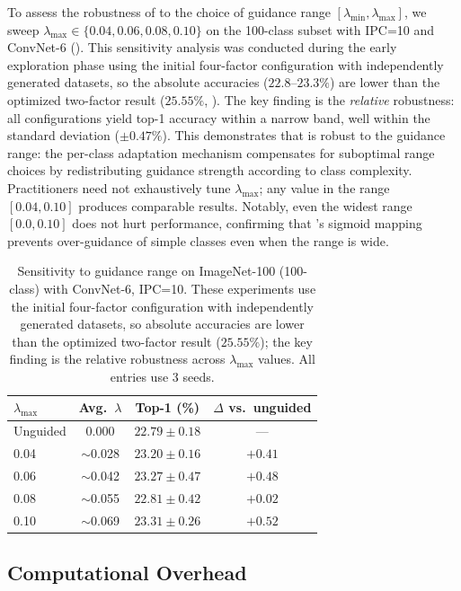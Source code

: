 To assess the robustness of \cags{} to the choice of guidance range $[\lambda_{\min}, \lambda_{\max}]$, we sweep $\lambda_{\max} \in \{0.04, 0.06, 0.08, 0.10\}$ on the 100-class subset with IPC=10 and ConvNet-6 (). This sensitivity analysis was conducted during the early exploration phase using the initial four-factor configuration with independently generated datasets, so the absolute accuracies ($22.8$--$23.3\%$) are lower than the optimized two-factor result ($25.55\%$, ). The key finding is the \emph{relative} robustness: all configurations yield top-1 accuracy within a narrow band, well within the standard deviation ($\pm 0.47\%$). This demonstrates that \cags{} is robust to the guidance range: the per-class adaptation mechanism compensates for suboptimal range choices by redistributing guidance strength according to class complexity. Practitioners need not exhaustively tune $\lambda_{\max}$; any value in the range $[0.04, 0.10]$ produces comparable results. Notably, even the widest range $[0.0, 0.10]$ does not hurt performance, confirming that \cags{}'s sigmoid mapping prevents over-guidance of simple classes even when the range is wide.

\begin{table}[t]
\centering
\caption{Sensitivity to guidance range on ImageNet-100 (100-class) with ConvNet-6, IPC=10. These experiments use the initial four-factor configuration with independently generated datasets, so absolute accuracies are lower than the optimized two-factor result ($25.55\%$); the key finding is the relative robustness across $\lambda_{\max}$ values. All entries use 3 seeds.}
\label{tab:sensitivity}
\begin{tabular}{lccc}
\toprule
\textbf{$\lambda_{\max}$} & \textbf{Avg.\ $\lambda$} & \textbf{Top-1 (\%)} & \textbf{$\Delta$ vs.\ unguided} \\
\midrule
Unguided & 0.000 & $22.79 \pm 0.18$ & --- \\
\midrule
0.04 & $\sim$0.028 & $23.20 \pm 0.16$ & $+0.41$ \\
0.06 & $\sim$0.042 & $23.27 \pm 0.47$ & $+0.48$ \\
0.08 & $\sim$0.055 & $22.81 \pm 0.42$ & $+0.02$ \\
0.10 & $\sim$0.069 & $23.31 \pm 0.26$ & $+0.52$ \\
\bottomrule
\end{tabular}
\end{table}

\subsection{Computational Overhead}
\label{sec:compute-efficiency}

